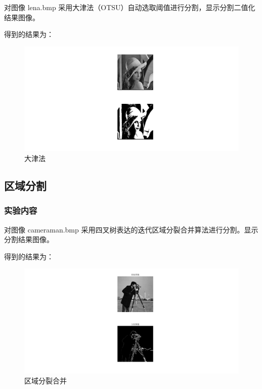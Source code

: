 \documentclass{ctexart}
\begin{document}
对图像 lena.bmp 采用大津法（OTSU）自动选取阈值进行分割，显示分割二值化
结果图像。
\par 得到的结果为：
\begin{figure}[H]
    \centering
    \includegraphics[scale=0.35]{5_2.png}
    \caption{大津法}
\end{figure}
\subsection{\hei 区域分割}
\subsubsection{\hei 实验内容}
对图像 cameraman.bmp 采用四叉树表达的迭代区域分裂合并算法进行分割。显示
分割结果图像。
\par 得到的结果为：
\begin{figure}[H]
    \centering
    \includegraphics[scale=0.35]{5_3.png}
    \caption{区域分裂合并}
\end{figure}
\end{document}
